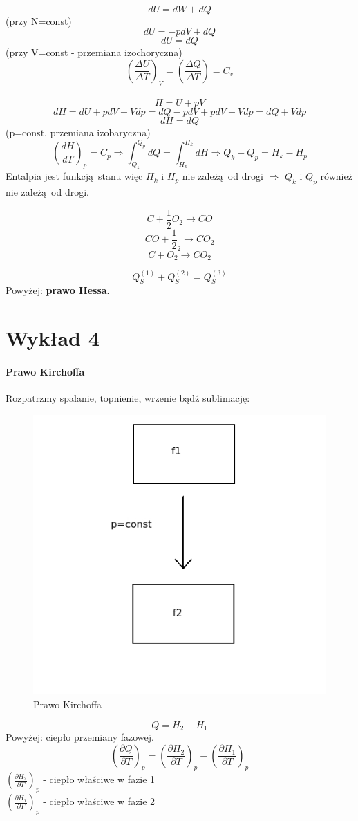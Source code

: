 \documentclass{article}
\begin{document}
		\paragraph{}
		$$dU = dW + dQ$$
		(przy N=const)
		$$dU = -pdV + dQ$$
		$$dU = dQ$$
		(przy V=const - przemiana izochoryczna)
		$$(\frac{\Delta U}{\Delta T})_V = (\frac{\Delta Q}{\Delta T}) = C_v$$
		\paragraph{}
		$$H = U + pV$$
		$$dH = dU + pdV + Vdp = dQ - pdV + pdV + Vdp = dQ + Vdp$$
		$$dH = dQ$$
		(p=const, przemiana izobaryczna)
		$$(\frac{dH}{dT})_p = C_p \Rightarrow \int_{Q_k}^{Q_p}dQ = \int_{H_p}^{H_k}dH
		\Rightarrow Q_k - Q_p = H_k - H_p$$
		Entalpia jest funkcją stanu więc $H_k$ i $H_p$ nie zależą od drogi $\Rightarrow$ $Q_k$ i $Q_p$ również nie zależą od drogi.
		
		$$C + \frac{1}{2}O_2 \longrightarrow CO$$
		$$CO + \frac{1}{2}_2 \longrightarrow CO_2$$
		$$C + O_2 \longrightarrow CO_2$$
		
		$$Q_S^{(1)} + Q_S^{(2)} = Q_S^{(3)}$$
		Powyżej: \textbf{prawo Hessa}.
	\section{Wykład 4}
		\paragraph{Prawo Kirchoffa}
		Rozpatrzmy spalanie, topnienie, wrzenie bądź sublimację:		
			\begin{figure}[ht]
				\label{fig:fig1}
				\centering
				\includegraphics[scale=0.6]{prawokirchoffa.jpeg}
				\caption{Prawo Kirchoffa}
			\end{figure}
		$$Q = H_2 - H_1$$
		Powyżej: ciepło przemiany fazowej.
		$$(\frac{\partial Q}{\partial T})_p = (\frac{\partial H_2}{\partial T})_p - (\frac{\partial H_1}{\partial T})_p$$
		$(\frac{\partial H_2}{\partial T})_p$ - ciepło właściwe w fazie 1 \\
		$(\frac{\partial H_1}{\partial T})_p$ - ciepło właściwe w fazie 2 \\
\end{document}
